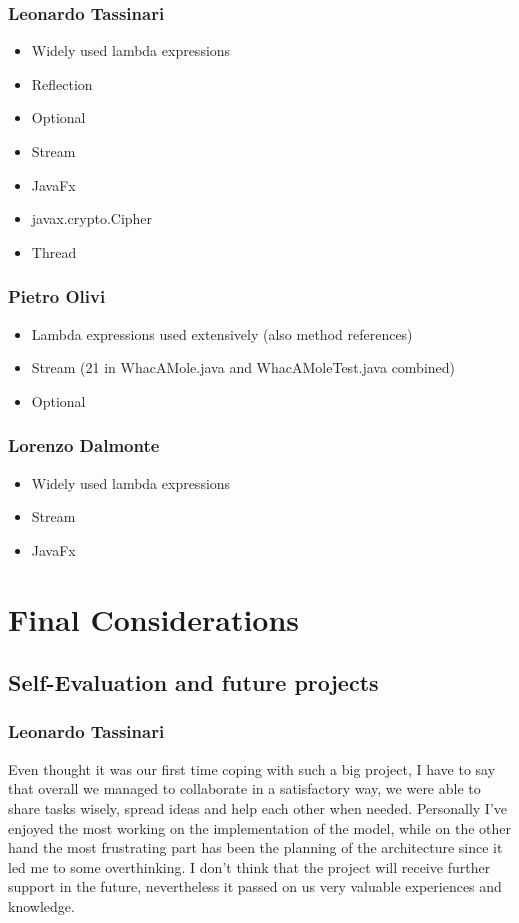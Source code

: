 \documentclass[a4paper,12pt]{report}
\begin{document}
\subsection*{Leonardo Tassinari}
\begin{itemize}
	\item Widely used lambda expressions
	\item Reflection
	\item Optional
	\item Stream
	\item JavaFx
	\item javax.crypto.Cipher
	\item Thread
\end{itemize}

\subsection*{Pietro Olivi}
\begin{itemize}
	\item Lambda expressions used extensively (also method references)
	\item Stream (21 in WhacAMole.java and WhacAMoleTest.java combined)
	\item Optional
\end{itemize}

\subsection*{Lorenzo Dalmonte}
\begin{itemize}
	\item Widely used lambda expressions
	\item Stream
	\item JavaFx
\end{itemize}
\chapter{Final Considerations}
\section{Self-Evaluation and future projects}
\subsection*{Leonardo Tassinari}
Even thought it was our first time coping with such a big project,
I have to say that overall we managed to collaborate in a satisfactory way, we were able to share tasks wisely, spread ideas and help each other when needed.
Personally I've enjoyed the most working on the implementation of the model, while on the other hand the most frustrating part has been the planning of the architecture since it led me to some overthinking.
I don't think that the project will receive further support in the future, nevertheless it passed on us very valuable experiences and knowledge.
\end{document}
